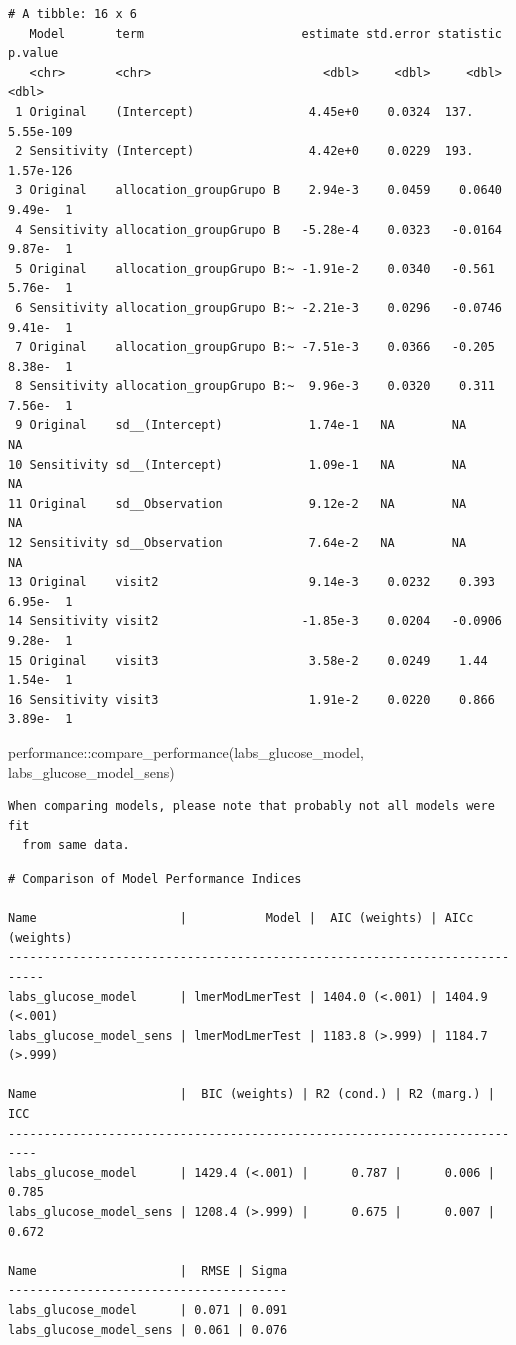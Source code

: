 \documentclass[
  letterpaper,
  DIV=11,
  numbers=noendperiod]{scrartcl}
\newenvironment{Shaded}{\begin{snugshade}}{\end{snugshade}}
\newcommand{\FunctionTok}[1]{\textcolor[rgb]{0.28,0.35,0.67}{#1}}
\newcommand{\NormalTok}[1]{\textcolor[rgb]{0.00,0.23,0.31}{#1}}
\newcommand{\SpecialCharTok}[1]{\textcolor[rgb]{0.37,0.37,0.37}{#1}}
\begin{document}
\begin{verbatim}
# A tibble: 16 x 6
   Model       term                      estimate std.error statistic    p.value
   <chr>       <chr>                        <dbl>     <dbl>     <dbl>      <dbl>
 1 Original    (Intercept)                4.45e+0    0.0324  137.      5.55e-109
 2 Sensitivity (Intercept)                4.42e+0    0.0229  193.      1.57e-126
 3 Original    allocation_groupGrupo B    2.94e-3    0.0459    0.0640  9.49e-  1
 4 Sensitivity allocation_groupGrupo B   -5.28e-4    0.0323   -0.0164  9.87e-  1
 5 Original    allocation_groupGrupo B:~ -1.91e-2    0.0340   -0.561   5.76e-  1
 6 Sensitivity allocation_groupGrupo B:~ -2.21e-3    0.0296   -0.0746  9.41e-  1
 7 Original    allocation_groupGrupo B:~ -7.51e-3    0.0366   -0.205   8.38e-  1
 8 Sensitivity allocation_groupGrupo B:~  9.96e-3    0.0320    0.311   7.56e-  1
 9 Original    sd__(Intercept)            1.74e-1   NA        NA      NA        
10 Sensitivity sd__(Intercept)            1.09e-1   NA        NA      NA        
11 Original    sd__Observation            9.12e-2   NA        NA      NA        
12 Sensitivity sd__Observation            7.64e-2   NA        NA      NA        
13 Original    visit2                     9.14e-3    0.0232    0.393   6.95e-  1
14 Sensitivity visit2                    -1.85e-3    0.0204   -0.0906  9.28e-  1
15 Original    visit3                     3.58e-2    0.0249    1.44    1.54e-  1
16 Sensitivity visit3                     1.91e-2    0.0220    0.866   3.89e-  1
\end{verbatim}

\begin{Shaded}
\begin{Highlighting}[]
\NormalTok{performance}\SpecialCharTok{::}\FunctionTok{compare\_performance}\NormalTok{(labs\_glucose\_model, labs\_glucose\_model\_sens)}
\end{Highlighting}
\end{Shaded}

\begin{verbatim}
When comparing models, please note that probably not all models were fit
  from same data.
\end{verbatim}

\begin{verbatim}
# Comparison of Model Performance Indices

Name                    |           Model |  AIC (weights) | AICc (weights)
---------------------------------------------------------------------------
labs_glucose_model      | lmerModLmerTest | 1404.0 (<.001) | 1404.9 (<.001)
labs_glucose_model_sens | lmerModLmerTest | 1183.8 (>.999) | 1184.7 (>.999)

Name                    |  BIC (weights) | R2 (cond.) | R2 (marg.) |   ICC
--------------------------------------------------------------------------
labs_glucose_model      | 1429.4 (<.001) |      0.787 |      0.006 | 0.785
labs_glucose_model_sens | 1208.4 (>.999) |      0.675 |      0.007 | 0.672

Name                    |  RMSE | Sigma
---------------------------------------
labs_glucose_model      | 0.071 | 0.091
labs_glucose_model_sens | 0.061 | 0.076
\end{verbatim}
\end{document}
